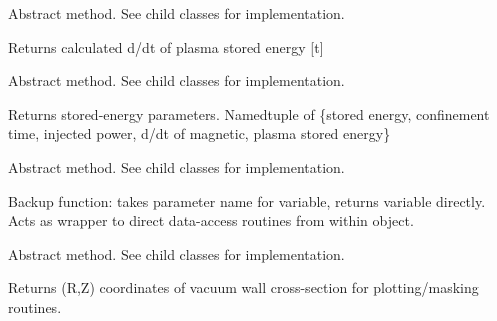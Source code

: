 \documentclass[letterpaper,10pt,english]{sphinxmanual}
\begin{document}
\begin{fulllineitems}

\begin{fulllineitems}
\label{eqtools:eqtools.core.Equilibrium.getWpdot}
Abstract method.  See child classes for implementation.

Returns calculated d/dt of plasma stored energy {[}t{]}

\end{fulllineitems}


\begin{fulllineitems}
\label{eqtools:eqtools.core.Equilibrium.getEnergy}
Abstract method.  See child classes for implementation.

Returns stored-energy parameters.
Namedtuple of \{stored energy, confinement time, injected power, d/dt of magnetic, plasma stored energy\}

\end{fulllineitems}


\begin{fulllineitems}
\label{eqtools:eqtools.core.Equilibrium.getParam}
Abstract method.  See child classes for implementation.

Backup function: takes parameter name for variable, returns variable directly.
Acts as wrapper to direct data-access routines from within object.

\end{fulllineitems}


\begin{fulllineitems}
\label{eqtools:eqtools.core.Equilibrium.getMachineCrossSection}
Abstract method.  See child classes for implementation.

Returns (R,Z) coordinates of vacuum wall cross-section for plotting/masking routines.

\end{fulllineitems}



\end{fulllineitems}
\end{document}
